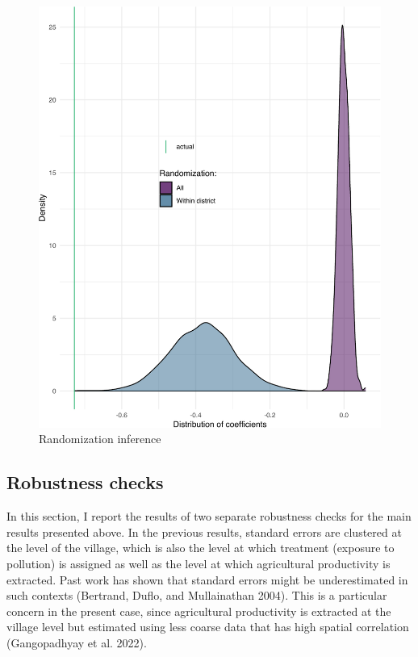 \documentclass[
]{article}
\begin{document}
\begin{figure}
\includegraphics{draft_files/figure-latex/randomplot-1} \caption[Randomization inference]{Randomization inference}\label{fig:randomplot}
\end{figure}

\hypertarget{robustness-checks}{%
\subsection{Robustness checks}\label{robustness-checks}}

In this section, I report the results of two separate robustness checks for the main results presented above. In the previous results, standard errors are clustered at the level of the village, which is also the level at which treatment (exposure to pollution) is assigned as well as the level at which agricultural productivity is extracted. Past work has shown that standard errors might be underestimated in such contexts (Bertrand, Duflo, and Mullainathan 2004). This is a particular concern in the present case, since agricultural productivity is extracted at the village level but estimated using less coarse data that has high spatial correlation (Gangopadhyay et al. 2022).
\end{document}
